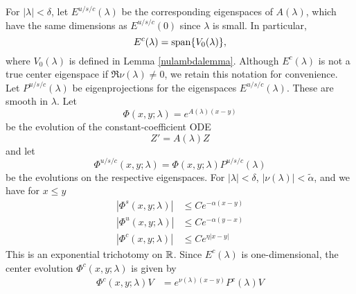 \documentclass[thesis.tex]{subfiles}
\begin{document}
For $|\lambda| < \delta$, let $E^{u/s/c}(\lambda)$ be the corresponding eigenspaces of $A(\lambda)$, which have the same dimensions as $E^{u/s/c}(0)$ since $\lambda$ is small. In particular, 
\[
E^c(\lambda) = \operatorname{span}\{ V_0(\lambda) \},
\]
where $V_0(\lambda)$ is defined in Lemma \ref{nulambdalemma}. Although $E^c(\lambda)$ is not a true center eigenspace if $\Re \nu(\lambda) \neq 0$, we retain this notation for convenience. Let $P^{u/s/c}(\lambda)$ be eigenprojections for the eigenspaces $E^{u/s/c}(\lambda)$. These are smooth in $\lambda$. Let
\begin{equation}
\Phi(x, y; \lambda) = e^{A(\lambda)(x-y)}
\end{equation}
be the evolution of the constant-coefficient ODE
\begin{equation}\label{constcoeffZ}
Z' = A(\lambda) Z
\end{equation}
and let 
\begin{equation}\label{Zevoltri}
\Phi^{u/s/c}(x, y; \lambda) = \Phi(x, y; \lambda)P^{u/s/c}(\lambda)
\end{equation}
be the evolutions on the respective eigenspaces. For $|\lambda| < \delta$, $|\nu(\lambda)| < \tilde{\alpha}$, and we have for $x \leq y$
\begin{equation}\label{Zevolbounds}
\begin{aligned}
|\Phi^s(x, y; \lambda)| &\leq C e^{-\alpha(x - y)} \\
|\Phi^u(x, y; \lambda)| &\leq C e^{-\alpha(y - x)} \\
|\Phi^c(x, y; \lambda)| &\leq C e^{\eta|x - y|} 
\end{aligned}
\end{equation}
This is an exponential trichotomy on $\mathbb{R}$. Since $E^c(\lambda)$ is one-dimensional, the center evolution $\Phi^c(x, y; \lambda)$ is given by
\begin{align}\label{centerevol}
\Phi^c(x, y; \lambda) V &= e^{\nu(\lambda)(x - y)} P^c(\lambda)V
\end{align}
\end{document}
